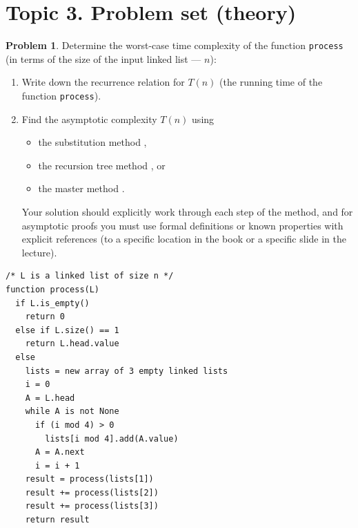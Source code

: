 \documentclass[dvipsnames]{article}
\begin{document}
\;

\section*{Topic 3. Problem set (theory)}
\setcounter{section}{3}

\thispagestyle{fancy}

\theoremstyle{definition}
\newtheorem{problem}{Problem}[section]

\begin{problem}
  Determine the worst-case time complexity of the function \texttt{process} (in terms of the size of the input linked list --- $n$):

  \begin{minipage}{0.5\textwidth}
  \setlength{\leftmargini}{0em}
  \begin{enumerate}
    \item Write down the recurrence relation for $T(n)$ (the running time of the function \texttt{process}).
    \item Find the asymptotic complexity $T(n)$ using
    \begin{itemize}
      \item the substitution method \cite[\S 4.3]{CLRS-2022},
      \item the recursion tree method \cite[\S 4.4]{CLRS-2022}, or
      \item the master method \cite[\S 4.5]{CLRS-2022}.
    \end{itemize}
    Your solution should explicitly work through each step of the method, and for asymptotic proofs you must use formal definitions
    or known properties with explicit references (to a specific location in the book \cite{CLRS-2022} or a specific slide in the lecture).
  \end{enumerate}
\end{minipage}
\begin{minipage}{0.05\textwidth}
  \;
\end{minipage}
\begin{minipage}{0.45\textwidth}

  \begin{verbatim}
/* L is a linked list of size n */
function process(L)
  if L.is_empty()
    return 0
  else if L.size() == 1
    return L.head.value
  else
    lists = new array of 3 empty linked lists
    i = 0
    A = L.head
    while A is not None
      if (i mod 4) > 0
        lists[i mod 4].add(A.value)
      A = A.next
      i = i + 1
    result = process(lists[1])
    result += process(lists[2])
    result += process(lists[3])
    return result
  \end{verbatim}
\end{minipage}


\end{problem}
\end{document}
